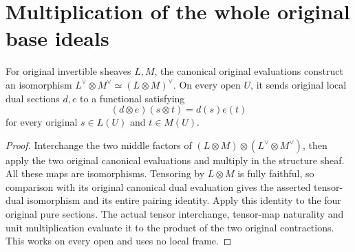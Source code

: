 \section{Multiplication of the whole original base ideals}

\begin{lemma}
\label{lem:actual-invertible-tensor-dual-contraction}
For original invertible sheaves $L,M$, the canonical original
evaluations construct an isomorphism
$L^\vee\otimes M^\vee\simeq(L\otimes M)^\vee$.
On every open $U$, it sends original local dual sections $d,e$ to a
functional satisfying
\[
 (d\otimes e)(s\otimes t)=d(s)e(t)
\]
for every original $s\in L(U)$ and $t\in M(U)$.
\leanok
\end{lemma}
\begin{proof}
Interchange the two middle factors of
$(L\otimes M)\otimes(L^\vee\otimes M^\vee)$, then apply the two
original canonical evaluations and multiply in the structure sheaf.
All these maps are isomorphisms. Tensoring by $L\otimes M$ is fully
faithful, so comparison with its original canonical dual evaluation
gives the asserted tensor-dual isomorphism and its entire pairing
identity. Apply this identity to the four original pure sections.
The actual tensor interchange, tensor-map naturality and unit
multiplication evaluate it to the product of the two original
contractions. This works on every open and uses no local frame.
\end{proof}

